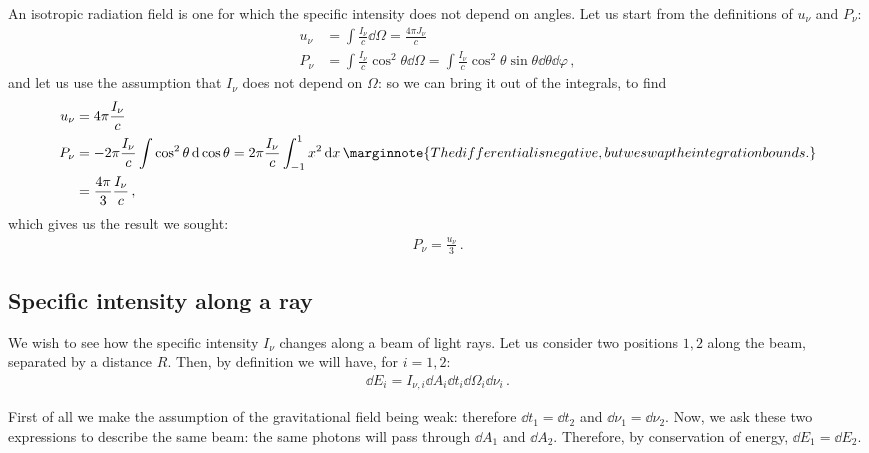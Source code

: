 \documentclass[main.tex]{subfiles}
\begin{document}
An isotropic radiation field is one for which the specific intensity does not depend on angles. 
Let us start from the definitions of \(u_{\nu }\) and \(P_{\nu }\): 
%
\begin{subequations}
\begin{align}
u_{\nu } &= \int \frac{I_{\nu }}{c} \dd{\Omega } = \frac{4 \pi J_{\nu }}{c}  \\
P_{\nu } &= \int  \frac{I_{\nu }}{c}  \cos^2\theta \dd{\Omega } =
\int \frac{I_{\nu }}{c} \cos^2\theta \sin \theta \dd{\theta } \dd{\varphi }
\,,
\end{align}
\end{subequations}
%
and let us use the assumption that \(I_\nu \) does not depend on \(\Omega \): so we can bring it out of the integrals, to find 
%
\begin{subequations}
\begin{align}
u_{\nu } &= 4 \pi  \frac{I_{\nu }}{c}  \\
P_{\nu } &= - 2 \pi  \frac{I_{\nu }}{c} \int \cos^2\theta \dd{\cos \theta } = 2 \pi \frac{I_{\nu }}{c} \int_{-1}^{1} x^2 \dd{x}  \marginnote{The differential is negative, but we swap the integration bounds.}\\
&= \frac{4 \pi }{3} \frac{I_{\nu }}{c}
\,,
\end{align}
\end{subequations}
%
which gives us the result we sought: 
%
\begin{align}
P_{\nu } = \frac{u_{\nu }}{3}
\,.
\end{align}

\subsection{Specific intensity along a ray}

We wish to see how the specific intensity \(I_{\nu }\) changes along a beam of light rays. Let us consider two positions \(1, 2\) along the beam, separated by a distance \(R\). Then, by definition we will have, for \(i =1, 2\):
%
\begin{align}
\dd{E_{i}} = I_{\nu, i} \dd{A_{i}} \dd{t_{i}} \dd{\Omega_{i}} \dd{\nu_{i}}
\,.
\end{align}

First of all we make the assumption of the gravitational field being weak: therefore \(\dd{t_{1}} = \dd{t_2 }\) and \(\dd{\nu_{1}} = \dd{\nu_2 }\). 
Now, we ask these two expressions to describe the same beam: the same photons will pass through \(\dd{A_1 }\) and  \(\dd{A_2 }\).  
Therefore, by conservation of energy, \(\dd{E_1 } = \dd{E_2 }\). 
\end{document}
